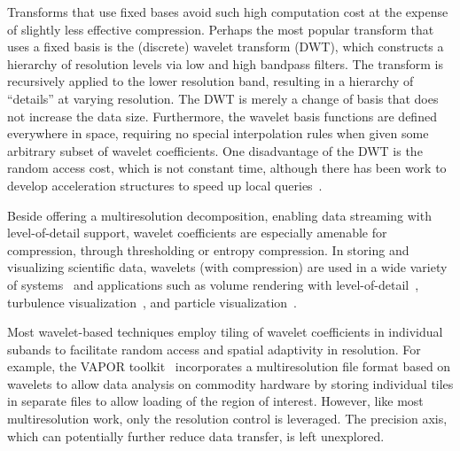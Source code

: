 Transforms that use fixed bases avoid such high computation cost at the expense of slightly less
effective compression. Perhaps the most popular transform that uses a fixed basis is the (discrete)
wavelet transform (DWT), which constructs a hierarchy of resolution levels via low and high bandpass
filters. The transform is recursively applied to the lower resolution band, resulting in a hierarchy
of ``details'' at varying resolution. The DWT is merely a change of basis that does not increase the
data size. Furthermore, the wavelet basis functions are defined everywhere in space, requiring no
special interpolation rules when given some arbitrary subset of wavelet coefficients. One
disadvantage of the DWT is the random access cost, which is not constant time, although there has
been work to develop acceleration structures to speed up local queries~\cite{weiss}.

Beside offering a multiresolution decomposition, enabling data streaming with level-of-detail
support, wavelet coefficients are especially amenable for compression, through thresholding or
entropy compression. In storing and visualizing scientific data, wavelets (with compression) are
used in a wide variety of systems~\cite{multires_toolkit2003,vapor2007,woodring2011} and
applications such as volume rendering with
level-of-detail~\cite{wavelet-compression-interactive-vis,multires-framework,rapid-compression-volume,interactive-rendering-large-volume,multires-volume-rendering},
turbulence visualization~\cite{treib}, and particle visualization~\cite{sph-octree}.

Most wavelet-based techniques employ tiling of wavelet coefficients in individual subands to
facilitate random access and spatial adaptivity in resolution. For example, the VAPOR
toolkit~\cite{vapor2007} incorporates a multiresolution file format based on wavelets to allow
data analysis on commodity hardware by storing individual tiles in separate files to allow loading
of the region of interest. However, like most multiresolution work, only the resolution control is
leveraged. The precision axis, which can potentially further reduce data transfer, is left
unexplored.

